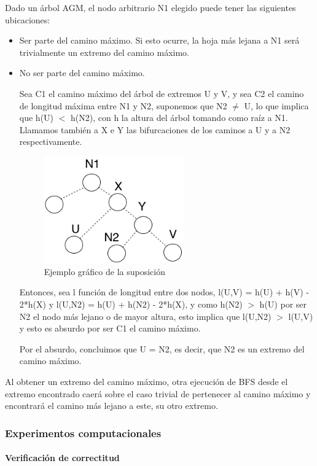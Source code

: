\documentclass[a4paper, 10pt, twoside]{article}
\begin{document}
Dado un árbol AGM, el nodo arbitrario N1 elegido puede tener las siguientes ubicaciones:
\begin{itemize}
	\item Ser parte del camino máximo. Si esto ocurre, la hoja más lejana a N1 será trivialmente un extremo del camino máximo.
	\item No ser parte del camino máximo.
	
	Sea C1 el camino máximo del árbol de extremos U y V, y sea C2 el camino de longitud máxima entre N1 y N2, suponemos que N2 $\neq$ U, lo que implica que h(U) $<$ h(N2), con h la altura del árbol tomando como raíz a N1. Llamamos también a X e Y las bifurcaciones de los caminos a U y a N2 respectivamente.

\begin{figure}[ht!]
\centering
\includegraphics[width=60mm]{2b.png}
\caption{Ejemplo gráfico de la suposición}
\label{overflow}
\end{figure}	
	
	Entonces, sea l función de longitud entre dos nodos, l(U,V) = h(U) + h(V) - 2*h(X) y l(U,N2) = h(U) + h(N2) - 2*h(X), y como h(N2) $>$ h(U) por ser N2 el nodo más lejano o de mayor altura, esto implica que l(U,N2) $>$ l(U,V) y esto es absurdo por ser C1 el camino máximo.
	
	Por el absurdo, concluimos que U = N2, es decir, que N2 es un extremo del camino máximo.
\end{itemize}

Al obtener un extremo del camino máximo, otra ejecución de BFS desde el extremo encontrado caerá sobre el caso trivial de pertenecer al camino máximo y encontrará el camino más lejano a este, su otro extremo.

\subsubsection{Experimentos computacionales}

\paragraph{Verificación de correctitud}
\end{document}
